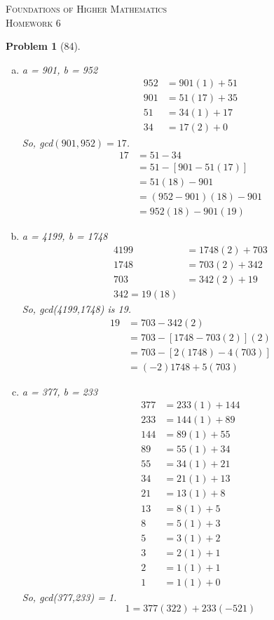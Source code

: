 \documentclass{article}
\theoremstyle{problem}
\newtheorem{prob}{Problem}
\theoremstyle{plain}
\theoremstyle{remark}
\begin{document}
\begin{center}
\textsc{\Large Foundations of Higher Mathematics}\\[.3cm]
\textsc{\Large Homework 6}
\end{center}

\begin{prob}[84]\ \\[-1cm]
\begin{enumerate}[a)]
\item a = 901, b = 952
  \begin{align*}
    952 &= 901(1) + 51\\
    901 &= 51(17) + 35\\
    51 &= 34(1) + 17\\
    34 &= 17(2) + 0   
  \end{align*}
  So, gcd$(901,952) = 17$.
  \begin{align*}
    17 &= 51 - 34\\
       &= 51 - [901 - 51(17)]\\
       &= 51(18) - 901\\
       &= (952-901)(18) - 901\\
       &= 952(18) - 901(19)
  \end{align*}
\item a = 4199, b = 1748
  \begin{align*}
    4199 &= 1748(2) + 703\\
    1748 &= 703(2) + 342\\
    703 &= 342(2) + 19\\
    342 = 19(18)
  \end{align*}
So, gcd(4199,1748) is 19.
\begin{align*}
  19 &= 703 - 342(2)\\
  &= 703 - [1748 - 703(2)](2)\\
  &= 703 - [2(1748) - 4(703)]\\
  &= (-2)1748 + 5(703)
\end{align*}

\item a = 377, b = 233
\begin{align*}
  377 &= 233(1) + 144\\
  233 &= 144(1) + 89\\
  144 &= 89(1) + 55\\
  89 &= 55(1) + 34\\
  55 &= 34(1) + 21\\
  34 &= 21(1) + 13\\
  21 &= 13(1) + 8\\
  13 &= 8(1) + 5\\
  8 &= 5(1) + 3\\
  5 &= 3(1) + 2\\
  3 &= 2(1) + 1\\
  2 &= 1(1) + 1\\
  1 &= 1(1) + 0
\end{align*}
So, gcd(377,233) = 1.
$$
1 = 377(322)+233(-521)
$$
\end{enumerate}
\end{prob}
\end{document}
